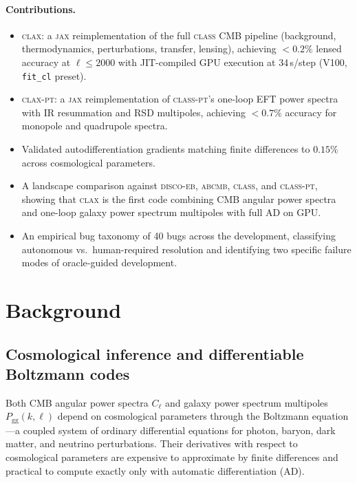 \documentclass{article}
\newcommand{\clax}{\textsc{clax}\xspace}
\newcommand{\claxpt}{\textsc{clax-pt}\xspace}
\newcommand{\class}{\textsc{class}\xspace}
\newcommand{\classpt}{\textsc{class-pt}\xspace}
\newcommand{\discoeb}{\textsc{disco-eb}\xspace}
\newcommand{\abcmb}{\textsc{abcmb}\xspace}
\newcommand{\jax}{\textsc{jax}\xspace}
\newcommand{\Cl}{C_\ell}
\begin{document}
\paragraph{Contributions.}
\begin{itemize}
    \item \clax: a \jax reimplementation of the full \class CMB pipeline (background, thermodynamics, perturbations, transfer, lensing), achieving $< 0.2\%$ lensed accuracy at $\ell \leq 2000$ with JIT-compiled GPU execution at 34\,s/step (V100, \texttt{fit\_cl} preset).
    \item \claxpt: a \jax reimplementation of \classpt's one-loop EFT power spectra with IR resummation and RSD multipoles, achieving $< 0.7\%$ accuracy for monopole and quadrupole spectra.
    \item Validated autodifferentiation gradients matching finite differences to $0.15\%$ across cosmological parameters.
    \item A landscape comparison against \discoeb, \abcmb, \class, and \classpt, showing that \clax is the first code combining CMB angular power spectra and one-loop galaxy power spectrum multipoles with full AD on GPU.
    \item An empirical bug taxonomy of 40 bugs across the development, classifying autonomous vs.\ human-required resolution and identifying two specific failure modes of oracle-guided development.
\end{itemize}

\section{Background}
\label{sec:background}

\subsection{Cosmological inference and differentiable Boltzmann codes}

Both CMB angular power spectra $\Cl$ and galaxy power spectrum multipoles $P_\mathrm{gg}(k, \ell)$ depend on cosmological parameters through the Boltzmann equation---a coupled system of ordinary differential equations for photon, baryon, dark matter, and neutrino perturbations.
Their derivatives with respect to cosmological parameters are expensive to approximate by finite differences and practical to compute exactly only with automatic differentiation (AD).
\end{document}
